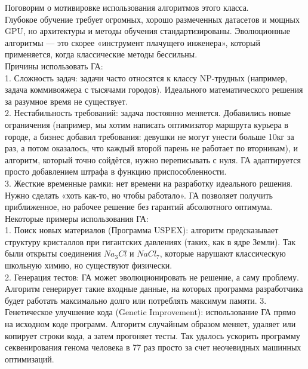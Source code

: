 Поговорим о мотивировке использования алгоритмов этого класса. \\
Глубокое обучение требует огромных, хорошо размеченных датасетов и мощных GPU, но архитектуры и методы обучения стандартизированы. Эволюционные алгоритмы — это скорее «инструмент плачущего инженера», который применяется, когда классические методы бессильны. \\
Причины использовать ГА: \\
1. Сложность задач: задачи часто относятся к классу NP-трудных (например, задача коммивояжера с тысячами городов). Идеального математического решения за разумное время не существует. \\
2. Нестабильность требований: задача постоянно меняется. Добавились новые ограничения (например, мы хотим написать оптимизатор маршрута курьера в городе, а бизнес добавил требования: девушки не могут унести больше 10кг за раз, а потом оказалось, что каждый второй парень не работает по вторникам), и алгоритм, который точно сойдётся, нужно переписывать с нуля. ГА адаптируется просто добавлением штрафа в функцию приспособленности. \\
3. Жесткие временные рамки: нет времени на разработку идеального решения. Нужно сделать «хоть как-то, но чтобы работало». ГА позволяет получить приближенное, но рабочее решение без гарантий абсолютного оптимума. \\

Некоторые примеры использования ГА: \\
1. Поиск новых материалов (Программа USPEX): алгоритм предсказывает структуру кристаллов при гигантских давлениях (таких, как в ядре Земли). Так были открыты соединения $Na_3Cl$ и $NaCl_7$, которые нарушают классическую школьную химию, но существуют физически. \\
2. Генерация тестов: ГА может эволюционировать не решение, а саму проблему. Алгоритм генерирует такие входные данные, на которых программа разработчика будет работать максимально долго или потреблять максимум памяти.
3. Генетическое улучшение кода (Genetic Improvement): использование ГА прямо на исходном коде программ. Алгоритм случайным образом меняет, удаляет или копирует строки кода, а затем прогоняет тесты. Так удалось ускорить программу секвенирования генома человека в 77 раз просто за счет неочевидных машинных оптимизаций.
\newpage
